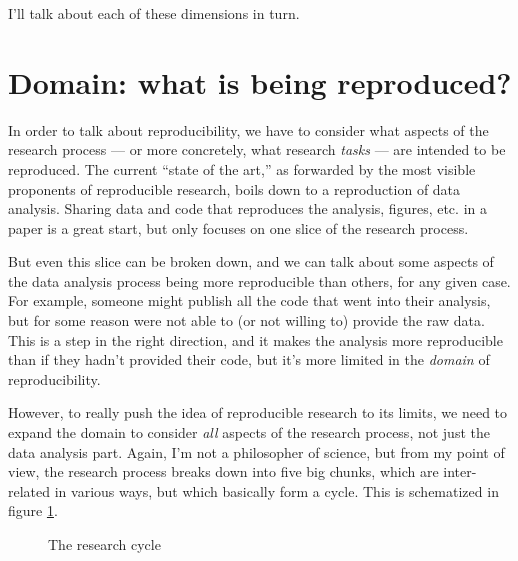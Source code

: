 \documentclass{book}
\begin{document}
I'll talk about each of these dimensions in turn.
\section{Domain: what is being reproduced?}
\label{sec-3-1}

In order to talk about reproducibility, we have to consider what aspects of the research process --- or more concretely, what research \emph{tasks} --- are intended to be reproduced.  The current ``state of the art,'' as forwarded by the most visible proponents of reproducible research, boils down to a reproduction of data analysis. Sharing data and code that reproduces the analysis, figures, etc. in a paper is a great start, but only focuses on one slice of the research process.

But even this slice can be broken down, and we can talk about some aspects of the data analysis process being more reproducible than others, for any given case.  For example, someone might publish all the code that went into their analysis, but for some reason were not able to (or not willing to) provide the raw data. This is a step in the right direction, and it makes the analysis more reproducible than if they hadn't provided their code, but it's more limited in the \emph{domain} of reproducibility.

However, to really push the idea of reproducible research to its limits, we need to expand the domain to consider \emph{all} aspects of the research process, not just the data analysis part.  Again, I'm not a philosopher of science, but from my point of view, the research process breaks down into five big chunks, which are inter-related in various ways, but which basically form a cycle.  This is schematized in figure \ref{rescycle}.  

  \begin{figure}[h]
  \caption{The research cycle}
  \centering
  \label{rescycle}
  \end{figure}
\end{document}
